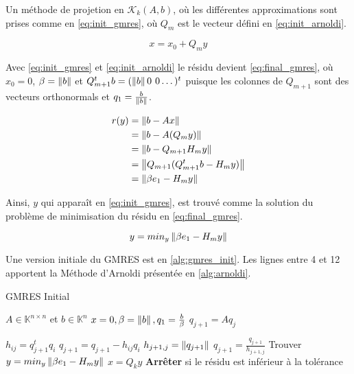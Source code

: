 Un méthode de projetion en $\mathcal{K}_{k}(A,b)$, où les différentes approximations sont prises comme en \ref{eq:init_gmres}, où $Q_{m}$ est le vecteur défini en \ref{eq:init_arnoldi}.

    \begin{equation}\label{eq:init_gmres}
        x = x_{0} + Q_{m}y
    \end{equation}

    Avec \ref{eq:init_gmres} et \ref{eq:init_arnoldi} le résidu devient \ref{eq:final_gmres}, où $x_{0} = 0$, $\beta=\left\lVert b\right\rVert$ et $Q_{m+1}^{t}b=(\left\lVert b\right\rVert 0 \hspace{0.05in} 0\dots)^{t}$ puisque les colonnes de $Q_{m+1}$ sont des vecteurs orthonormals et $q_{1} = \frac{b}{\left\lVert b\right\rVert}$. 

    \begin{align} \label{eq:final_gmres}
    \begin{split}
        r(y) &= \left\lVert b - Ax\right\rVert\\ 
        &= \left\lVert b - A(Q_{m}y)\right\rVert\\ 
        &= \left\lVert b-Q_{m+1}H_{m}y\right\rVert \\
        &= \left\lVert Q_{m+1}(Q_{m+1}^{t}b-H_{m}y)\right\rVert \\
        &= \left\lVert\beta e_{1} - H_{m}y\right\rVert
    \end{split}
    \end{align}

    Ainsi, $y$ qui apparaît en \ref{eq:init_gmres}, est trouvé comme la solution du problème de minimisation du résidu en \ref{eq:final_gmres}.

    \begin{equation}\label{eq:y_gmres}
        y = min_{y} \left\lVert\beta e_{1} - H_{m}y\right\rVert
    \end{equation}

    Une version initiale du GMRES est en \ref{alg:gmres_init}. Les lignes entre 4 et 12 apportent la Méthode d'Arnoldi présentée en \ref{alg:arnoldi}.
    
    \begin{algorithm}
    \caption{GMRES Initial}\label{alg:gmres_init}
    \begin{algorithmic}[1]
    \State $A \in \mathbb{K}^{n \times n}$ et $b\in \mathbb{K}^{n}$
    \State $x=0, \beta=\left\lVert b\right\rVert,q_{1}=\frac{b}{\beta}$
    \State $q_{j+1} = Aq_{j}$

    \State $h_{ij}= q_{j+1}^{t}q_{i}$
    \State $q_{j+1} = q_{j+1} - h_{ij}q_{i}$
    \EndFor
    \State $h_{j+1,j}=\left\lVert q_{j+1}\right\rVert$
    \State $q_{j+1} = \frac{q_{j+1}}{h_{j+1,j}}$
    \EndFor
    \State Trouver $y = min_{y} \left\lVert\beta e_{1} - H_{m}y\right\rVert$
    \State $x = Q_{k}y$
    \State \textbf{Arrêter} si le résidu est inférieur à la tolérance
    \EndFor
    \end{algorithmic}
    \end{algorithm}

